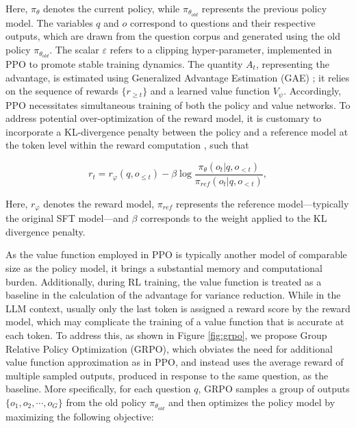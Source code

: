 \begin{itemize}[topsep=0pt]
Here, $\pi_{\theta}$ denotes the current policy, while $\pi_{\theta_{old}}$ represents the previous policy model. The variables $q$ and $o$ correspond to questions and their respective outputs, which are drawn from the question corpus and generated using the old policy $\pi_{\theta_{old}}$. The scalar $\varepsilon$ refers to a clipping hyper-parameter, implemented in PPO to promote stable training dynamics. The quantity $A_t$, representing the advantage, is estimated using Generalized Advantage Estimation (GAE) \citep{gae}; it relies on the sequence of rewards $\{r_{\ge t}\}$ and a learned value function $V_{\psi}$. Accordingly, PPO necessitates simultaneous training of both the policy and value networks. To address potential over-optimization of the reward model, it is customary to incorporate a KL-divergence penalty between the policy and a reference model at the token level within the reward computation \citep{ouyang2022training}, such that

\begin{equation}
    r_{t} = r_\varphi(q, o_{\le t}) - \beta \log\frac{\pi_{\theta}(o_{t}|q, o_{<t})}{\pi_{ref}(o_{t}|q, o_{<t})},
\label{eq:PPO-reward}
\end{equation}

Here, $r_\varphi$ denotes the reward model, $\pi_{ref}$ represents the reference model—typically the original SFT model—and $\beta$ corresponds to the weight applied to the KL divergence penalty.

As the value function employed in PPO is typically another model of comparable size as the policy model, it brings a substantial memory and computational burden. Additionally, during RL training, the value function is treated as a baseline in the calculation of the advantage for variance reduction. While in the LLM context, usually only the last token is assigned a reward score by the reward model, which may complicate the training of a value function that is accurate at each token. To address this, as shown in Figure \ref{fig:grpo}, we propose Group Relative Policy Optimization (GRPO), which obviates the need for additional value function approximation as in PPO, and instead uses the average reward of multiple sampled outputs, produced in response to the same question, as the baseline. More specifically, for each question $q$, GRPO samples a group of outputs $\{o_1, o_2, \cdots, o_G\}$  from the old policy  $\pi_{\theta_{old}}$  and then optimizes the policy model by maximizing the following objective:


\end{itemize}
